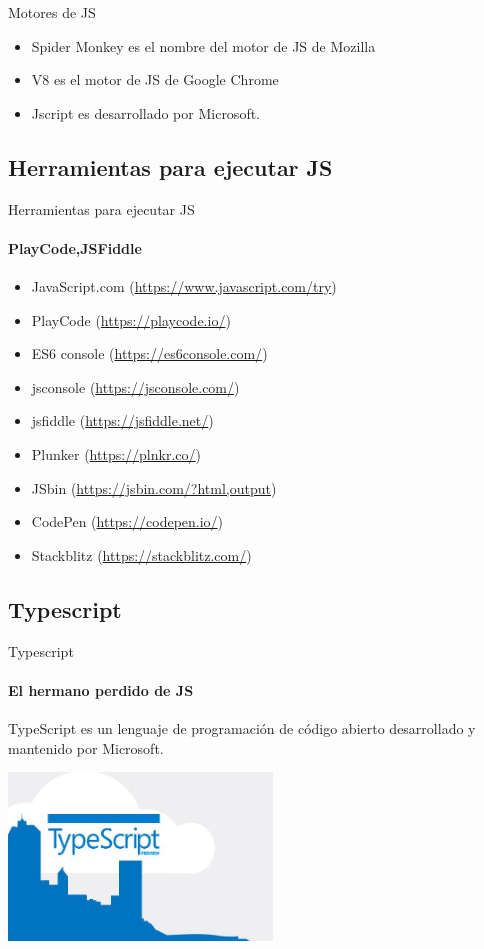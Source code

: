 \documentclass[aspectratio=169]{beamer}
\begin{document}
\begin{darkframes}
\begin{frame}{Motores de JS}
      \begin{itemize}
          \item Spider Monkey es el nombre del motor de JS de Mozilla
          \item V8 es el motor de JS de Google Chrome
          \item Jscript es desarrollado por Microsoft.
      \end{itemize}
    \end{frame}

    \subsection{Herramientas para ejecutar JS}
    \begin{frame}{Herramientas para ejecutar JS}
      \framesubtitle{PlayCode,JSFiddle}

      \begin{itemize}
        \item JavaScript.com (\url{https://www.javascript.com/try})
        \item PlayCode (\url{https://playcode.io/})
        \item ES6 console (\url{https://es6console.com/})
        \item jsconsole (\url{https://jsconsole.com/})
        \item jsfiddle (\url{https://jsfiddle.net/})
        \item Plunker (\url{https://plnkr.co/})
        \item JSbin (\url{https://jsbin.com/?html,output})
        \item CodePen (\url{https://codepen.io/})
        \item Stackblitz (\url{https://stackblitz.com/})
      \end{itemize}
    \end{frame}
    \subsection{Typescript}
    \begin{frame}{Typescript}
      \framesubtitle{El hermano perdido de JS}
        TypeScript es un lenguaje de programación de código abierto desarrollado y
        mantenido por Microsoft.
        \begin{center}
          \includegraphics[width=7cm]{download.jpeg}
        \end{center}


\end{frame}
\end{darkframes}
\end{document}

